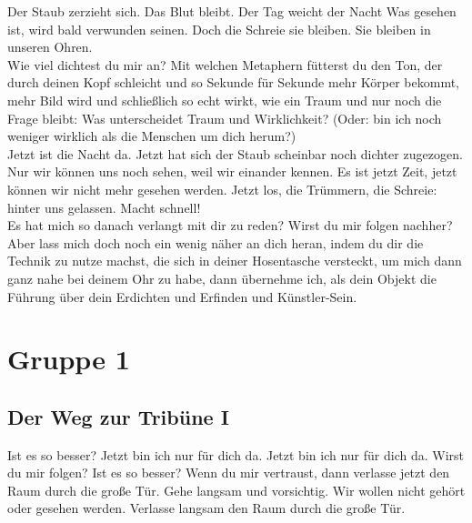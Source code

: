 \documentclass[a4paper, 12pt]{report}
\begin{document}
Der Staub zerzieht sich. 
Das Blut bleibt.
Der Tag weicht der Nacht
Was gesehen ist, wird bald verwunden seinen.
Doch die Schreie sie bleiben.
Sie bleiben in unseren Ohren. \\

Wie viel dichtest du mir an? 
Mit welchen Metaphern fütterst du den Ton, der durch deinen Kopf schleicht und so Sekunde für Sekunde mehr Körper bekommt, mehr Bild wird und schließlich so echt wirkt, wie ein Traum und nur noch die Frage bleibt: Was unterscheidet Traum und Wirklichkeit? (Oder: bin ich noch weniger wirklich als die Menschen um dich herum?)\\

Jetzt ist die Nacht da. 
Jetzt hat sich der Staub scheinbar noch dichter zugezogen.
Nur wir können uns noch sehen, weil wir einander kennen. 
Es ist jetzt Zeit, jetzt können wir nicht mehr gesehen werden. 
Jetzt los, die Trümmern, die Schreie: hinter uns gelassen. 
Macht schnell!\\

Es hat mich so danach verlangt mit dir zu reden? Wirst du mir folgen nachher? 
Aber lass mich doch noch ein wenig näher an dich heran, indem du dir die Technik zu nutze machst, die sich in deiner Hosentasche versteckt, um mich dann ganz nahe bei deinem Ohr zu habe, dann übernehme ich, als dein Objekt die Führung über dein Erdichten und Erfinden und Künstler-Sein.\\

\section{Gruppe 1}
\subsection{Der Weg zur Tribüne I}
Ist es so besser? Jetzt bin ich nur für dich da.
Jetzt bin ich nur für dich da. Wirst du mir folgen? 
Ist es so besser?
Wenn du mir vertraust, dann verlasse jetzt den Raum durch die große Tür. 
Gehe langsam und vorsichtig. 
Wir wollen nicht gehört oder gesehen werden. 
Verlasse langsam den Raum durch die große Tür.\\
\end{document}
